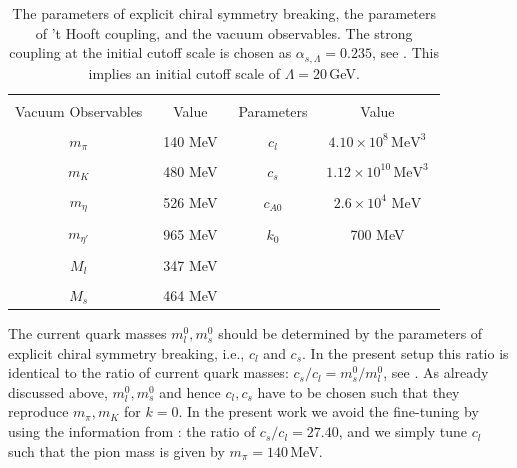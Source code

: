 \documentclass[reprint,twocolumn,superscriptaddress,preprintnumbers,amsmath,amssymb,aps,prd,floatfix]{revtex4-2}
\begin{document}
\begin{table}[t]
	\begin{center}
		\begin{tabular}{|c|c||c|c|}
			\hline & & & \\[-2ex]
			Vacuum Observables  & Value & Parameters & Value  \\[1ex]
			\hline & & &   \\[-2ex]
			$m_{\pi}$ & \, 140 MeV \, & $c_{l}$ & \, $4.10\times 10^{8}\,\mathrm{MeV}^{3}$ \, \\[1ex]
			\hline & & & \\[-2ex] 
			$m_{K}$ & 480 MeV & $c_{s}$ & $1.12 \times 10^{10}\,\mathrm{MeV}^{3}$ \\[1ex]
			\hline & & & \\[-2ex] 
			$m_{\eta}$ & 526 MeV & $ c_{A0}$ & $2.6\times 10^{4}$ $\mathrm{MeV}$ \\[1ex]
			\hline & & & \\[-2ex] 
			$m_{\eta'}$ & 965 MeV & $ k_{0}$ & 700 MeV \\[1ex]
			\hline & & & \\[-2ex] 
			$M_{l}$ & 347 MeV &  &  \\[1ex]
			\hline & & & \\[-2ex] 
			$M_{s}$ & 464 MeV &  &  \\[1ex]
			\hline
		\end{tabular}
		\caption{The parameters of explicit chiral symmetry breaking, the parameters of ’t Hooft coupling, and the vacuum observables. The strong coupling at the initial cutoff scale is chosen as $\alpha_{s,\Lambda}=0.235$, see . This implies an initial cutoff scale of $\Lambda=20$\,GeV.}
		\label{tab:Parameters+Observables}
	\end{center}\vspace{-0.5cm}
\end{table}

The current quark masses $m_l^0,m_s^0$ should be determined by the parameters of explicit chiral symmetry breaking, i.e., $c_l$ and $c_s$. In the present setup this ratio is identical to the ratio of current quark masses: $c_s/c_l= m_{s}^0/m_{l}^0$, see \cite{Fu:2019hdw}. As already discussed above, $m_l^0,m_s^0$  and hence $c_l,c_s$ have to be chosen such that they reproduce $m_\pi,m_K$ for $k=0$. In the present work we avoid the fine-tuning by using the information from \cite{Fu:2019hdw}: the ratio of $c_s/c_l = 27.40$, and we simply tune $c_l$ such that the pion mass is given by $m_\pi=140$\,MeV. 
\end{document}
